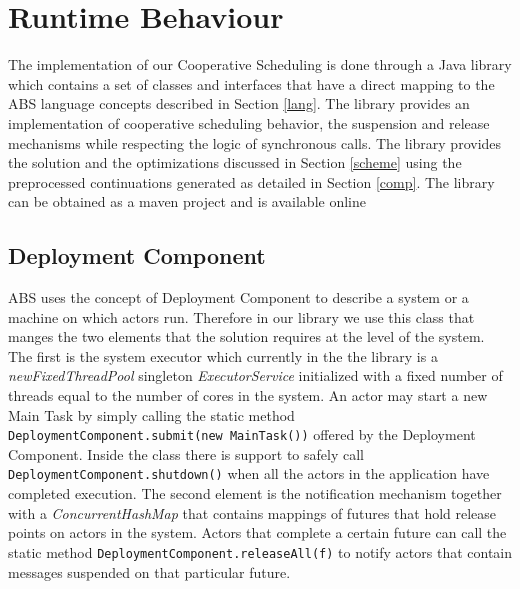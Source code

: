 \section{Runtime Behaviour}
\label{run}
The implementation of our Cooperative Scheduling is done through a Java library which contains a set of classes and interfaces that have a direct mapping to the ABS language concepts described in Section \ref{lang}. The library provides an implementation of cooperative scheduling behavior, the suspension and release mechanisms while respecting the logic of synchronous calls. The library provides the solution and the optimizations discussed in Section \ref{scheme} using the preprocessed continuations generated as detailed in Section \ref{comp}. The library can be obtained as a maven project and is available online\cite{library}

\subsection{Deployment Component}
ABS uses the concept of Deployment Component to describe a system or a machine on which actors run. Therefore in our library we use this class that manges the two elements that the solution requires at the level of the system. The first is the system executor which currently in the the library is a \textit{newFixedThreadPool} singleton \textit{ExecutorService} initialized with a fixed number of threads equal to the number of cores in the system. An actor may start a new Main Task by simply calling the static method \lstinline|DeploymentComponent.submit(new MainTask())| offered by the Deployment Component. Inside the class there is support to safely call \lstinline|DeploymentComponent.shutdown()| when all the actors in the application have completed execution. The second element is the notification mechanism together with a \textit{ConcurrentHashMap} that contains mappings of futures that hold release points on actors in the system. Actors that complete a certain future can call the static method \lstinline|DeploymentComponent.releaseAll(f)| to notify actors that contain messages suspended on that particular future. 



